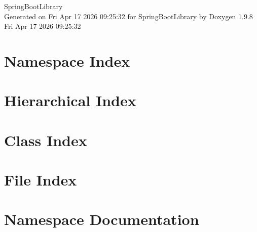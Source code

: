 \documentclass[twoside]{book}
\newcommand{\+}{\discretionary{\mbox{\scriptsize$\hookleftarrow$}}{}{}}
\newcommand{\clearemptydoublepage}{%
    \newpage{\pagestyle{empty}\cleardoublepage}%
  }
\begin{document}
  \raggedbottom
    \hypersetup{pageanchor=false,
                bookmarksnumbered=true,
                pdfencoding=unicode
               }
  \begin{titlepage}
  \vspace*{7cm}
  \begin{center}%
  {\Large Spring\+Boot\+Library}\\
  \vspace*{1cm}
  {\large Generated on Fri Apr 17 2026 09\+:25\+:32 for Spring\+Boot\+Library by Doxygen 1.9.8}\\
    \vspace*{0.5cm}
    {\small Fri Apr 17 2026 09:25:32}
  \end{center}
  \end{titlepage}
  \clearemptydoublepage
  \tableofcontents
  \clearemptydoublepage
  \hypersetup{pageanchor=true}
\chapter{Namespace Index}

\chapter{Hierarchical Index}

\chapter{Class Index}

\chapter{File Index}

\chapter{Namespace Documentation}








\end{document}
